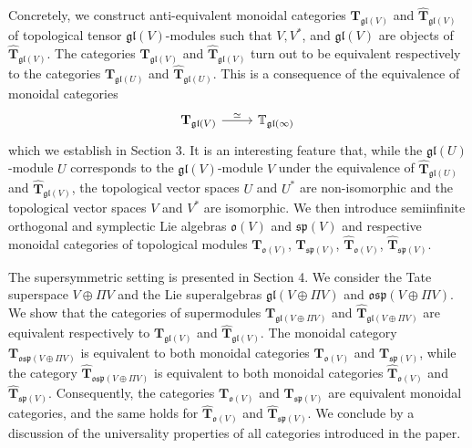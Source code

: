 \documentclass[12pt,reqno]{amsart}
\theoremstyle{definition}
\theoremstyle{remark}
\begin{document}
Concretely, we construct anti-equivalent monoidal categories 
$\mathbf{T}_{\mathfrak{gl}(V)}$ and $\widehat{\mathbf{T}}_{\mathfrak{gl}(V)}$ of topological tensor 
$\mathfrak{gl}(V)$-modules such that $V, V^\ast$, and $\mathfrak{gl}(V)$ are objects of $\widehat{\mathbf{T}}_{\mathfrak{gl}(V)}$.
The categories $\mathbf{T}_{\mathfrak{gl}(V)}$ and $\widehat{\mathbf{T}}_{\mathfrak{gl}(V)}$ turn out to be equivalent respectively to the categories $\mathbf{T}_{\mathfrak{gl}(U)}$ and $\widehat{\mathbf{T}}_{\mathfrak{gl}(U)}$. This is a consequence of the equivalence of monoidal categories
\[
\begin{tikzcd}
    \mathbf{T}_{\mathfrak{gl}(V)} \ar[r, "\simeq"]& \mathbb{T}_{\mathfrak{gl}(\infty)}
\end{tikzcd}
\]
 which we establish in Section 3. It is an interesting feature that, while the $\mathfrak{gl}(U)$-module $U$ corresponds to the $\mathfrak{gl}(V)$-module $V$ under the equivalence of $\widehat{\mathbf{T}}_{\mathfrak{gl}(U)}$ and $\widehat{\mathbf{T}}_{\mathfrak{gl}(V)}$, the topological vector spaces $U$ and $U^\ast$ are non-isomorphic and the topological vector spaces $V$ and $V^\ast$ are isomorphic.
 We then introduce semiinfinite orthogonal and symplectic Lie algebras $\mathfrak{o}(V)$ and $\mathfrak{sp}(V)$ and respective monoidal categories of topological modules 
 $\mathbf{T}_{\mathfrak{o}(V)}$, $\mathbf{T}_{\mathfrak{sp}(V)}$, $\widehat{\mathbf{T}}_{\mathfrak{o}(V)}$, $\widehat{\mathbf{T}}_{\mathfrak{sp}(V)}$.

 The supersymmetric setting is presented in Section 4. We consider the Tate superspace 
 $V\oplus \Pi V$ and the Lie superalgebras
$\mathfrak{gl}(V\oplus \Pi V)$ and $\mathfrak{osp}(V\oplus \Pi V)$.
We show that the categories of supermodules
$\mathbf{T}_{\mathfrak{gl}(V\oplus\Pi V)}$ and $\widehat{\mathbf{T}}_{\mathfrak{gl}(V\oplus\Pi V)}$ are equivalent respectively to 
$\mathbf{T}_{\mathfrak{gl}(V)}$ and $\widehat{\mathbf{T}}_{\mathfrak{gl}(V)}$.
The monoidal category $\mathbf{T}_{\mathfrak{osp}(V\oplus\Pi V)}$ is equivalent to both monoidal categories 
$\mathbf{T}_{\mathfrak{o}(V)}$ and $\mathbf{T}_{\mathfrak{sp}(V)}$,
while the category $\widehat{\mathbf{T}}_{\mathfrak{osp}(V\oplus\Pi V)}$ is equivalent to both monoidal categories 
$\widehat{\mathbf{T}}_{\mathfrak{o}(V)}$
and $\widehat{\mathbf{T}}_{\mathfrak{sp}(V)}$.
Consequently, the categories $\mathbf{T}_{\mathfrak{o}(V)}$ and $\mathbf{T}_{\mathfrak{sp}(V)}$ are equivalent monoidal categories, and the same holds for $\widehat{\mathbf{T}}_{\mathfrak{o}(V)}$
and $\widehat{\mathbf{T}}_{\mathfrak{sp}(V)}$.
We conclude by a discussion of the universality properties of all categories introduced in the paper.
\end{document}
